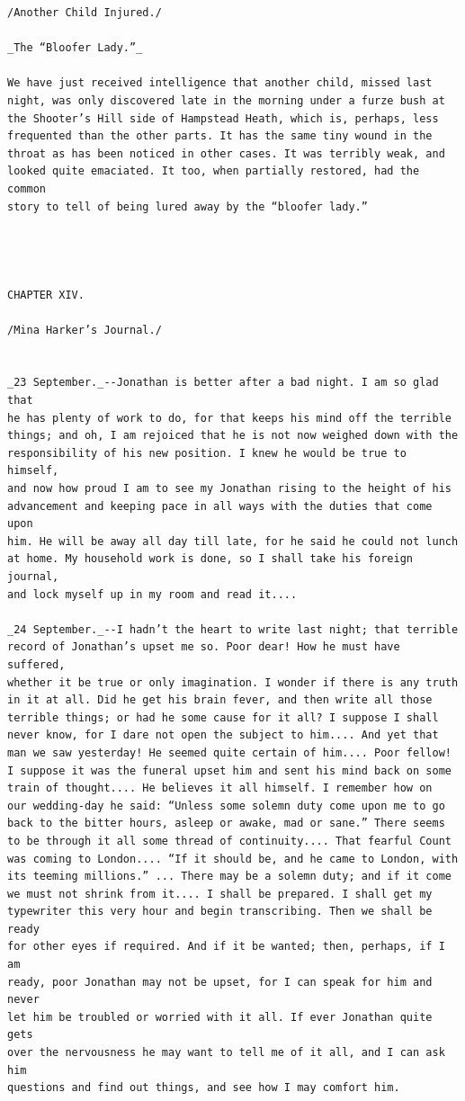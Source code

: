 \documentclass{article}
\begin{document}
\begin{verbatim}
/Another Child Injured./

_The “Bloofer Lady.”_

We have just received intelligence that another child, missed last
night, was only discovered late in the morning under a furze bush at
the Shooter’s Hill side of Hampstead Heath, which is, perhaps, less
frequented than the other parts. It has the same tiny wound in the
throat as has been noticed in other cases. It was terribly weak, and
looked quite emaciated. It too, when partially restored, had the common
story to tell of being lured away by the “bloofer lady.”




CHAPTER XIV.

/Mina Harker’s Journal./


_23 September._--Jonathan is better after a bad night. I am so glad that
he has plenty of work to do, for that keeps his mind off the terrible
things; and oh, I am rejoiced that he is not now weighed down with the
responsibility of his new position. I knew he would be true to himself,
and now how proud I am to see my Jonathan rising to the height of his
advancement and keeping pace in all ways with the duties that come upon
him. He will be away all day till late, for he said he could not lunch
at home. My household work is done, so I shall take his foreign journal,
and lock myself up in my room and read it....

_24 September._--I hadn’t the heart to write last night; that terrible
record of Jonathan’s upset me so. Poor dear! How he must have suffered,
whether it be true or only imagination. I wonder if there is any truth
in it at all. Did he get his brain fever, and then write all those
terrible things; or had he some cause for it all? I suppose I shall
never know, for I dare not open the subject to him.... And yet that
man we saw yesterday! He seemed quite certain of him.... Poor fellow!
I suppose it was the funeral upset him and sent his mind back on some
train of thought.... He believes it all himself. I remember how on
our wedding-day he said: “Unless some solemn duty come upon me to go
back to the bitter hours, asleep or awake, mad or sane.” There seems
to be through it all some thread of continuity.... That fearful Count
was coming to London.... “If it should be, and he came to London, with
its teeming millions.” ... There may be a solemn duty; and if it come
we must not shrink from it.... I shall be prepared. I shall get my
typewriter this very hour and begin transcribing. Then we shall be ready
for other eyes if required. And if it be wanted; then, perhaps, if I am
ready, poor Jonathan may not be upset, for I can speak for him and never
let him be troubled or worried with it all. If ever Jonathan quite gets
over the nervousness he may want to tell me of it all, and I can ask him
questions and find out things, and see how I may comfort him.



\end{verbatim}
\end{document}
